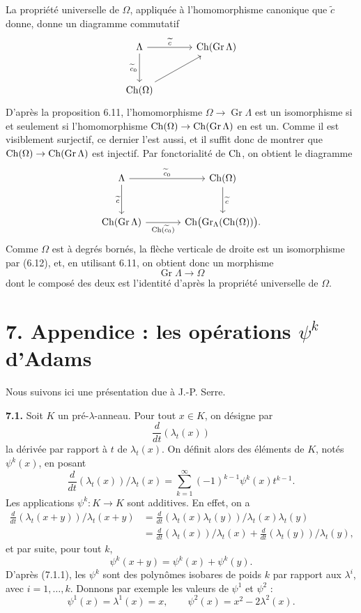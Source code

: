 \documentclass[11pt]{article}
\newcommand{\Gr}{\operatorname{Gr}}
\providecommand{\Gr}{\operatorname{Gr}}
\providecommand{\Gr}{\operatorname{G}}
\begin{document}
La propriété universelle de \(\Omega\), appliquée à l'homomorphisme canonique que \(\widetilde c\) donne, donne un diagramme commutatif
\[
\begin{tikzcd}[column sep=large,row sep=large]
\Lambda \arrow[r,"\widetilde c"] \arrow[d,"\widetilde c_0"'] &
\Ch(\Gr\Lambda)\\
\Ch(\Omega) \arrow[ur] &
\end{tikzcd}
\]
D'après la proposition 6.11, l'homomorphisme \(\Omega\to\Gr\Lambda\) est un isomorphisme si et seulement si l'homomorphisme \(\Ch(\Omega)\to\Ch(\Gr\Lambda)\) en est un. Comme il est visiblement surjectif, ce dernier l'est aussi, et il suffit donc de montrer que \(\Ch(\Omega)\to\Ch(\Gr\Lambda)\) est injectif. Par fonctorialité de \(\operatorname{Ch}\), on obtient le diagramme
\[
\begin{tikzcd}[column sep=large,row sep=large]
\Lambda \arrow[r,"\widetilde c_0"] \arrow[d,"\widetilde c"'] &
\Ch(\Omega) \arrow[d,"\widetilde c"]\\
\Ch(\Gr\Lambda) \arrow[r,"\Ch(\widetilde c_0)"'] &
\Ch\bigl(\Gr_\Lambda(\Ch(\Omega))\bigr).
\end{tikzcd}
\]
Comme \(\Omega\) est à degrés bornés, la flèche verticale de droite est un isomorphisme par (6.12), et, en utilisant 6.11, on obtient donc un morphisme
\[
  \Gr\Lambda\longrightarrow\Omega
\]
dont le composé des deux est l'identité d'après la propriété universelle de \(\Omega\).

\section*{7. Appendice : les opérations \(\psi^k\) d'Adams}

Nous suivons ici une présentation due à J.-P. Serre.

\textbf{7.1.} Soit \(K\) un pré-\(\lambda\)-anneau. Pour tout \(x\in K\), on désigne par
\[
  \frac{d}{dt}(\lambda_t(x))
\]
la dérivée par rapport à \(t\) de \(\lambda_t(x)\). On définit alors des éléments de \(K\), notés \(\psi^k(x)\), en posant
\begin{equation}\tag{7.1.1}
  \frac{d}{dt}(\lambda_t(x))/\lambda_t(x)
  =
  \sum_{k=1}^{\infty}(-1)^{k-1}\psi^k(x)t^{k-1}.
\end{equation}
Les applications \(\psi^k:K\to K\) sont additives. En effet, on a
\[
\begin{aligned}
 \frac{d}{dt}(\lambda_t(x+y))/\lambda_t(x+y)
 &=
 \frac{d}{dt}(\lambda_t(x)\lambda_t(y))/\lambda_t(x)\lambda_t(y)\\
 &=
 \frac{d}{dt}(\lambda_t(x))/\lambda_t(x)
 +\frac{d}{dt}(\lambda_t(y))/\lambda_t(y),
\end{aligned}
\]
et par suite, pour tout \(k\),
\[
  \psi^k(x+y)=\psi^k(x)+\psi^k(y).
\]
D'après (7.1.1), les \(\psi^k\) sont des polynômes isobares de poids \(k\) par rapport aux \(\lambda^i\), avec \(i=1,\ldots,k\). Donnons par exemple les valeurs de \(\psi^1\) et \(\psi^2\) :
\[
  \psi^1(x)=\lambda^1(x)=x,
  \qquad
  \psi^2(x)=x^2-2\lambda^2(x).
\]
\end{document}
